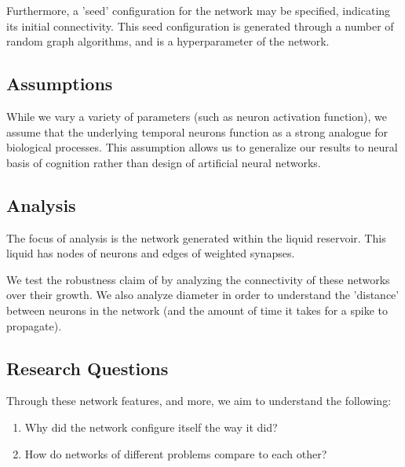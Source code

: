 Furthermore, a 'seed' configuration for the network may be specified, indicating
its initial connectivity. This seed configuration is generated through a
number of random graph algorithms, and is a hyperparameter of the network.

\subsection{Assumptions}

While we vary a variety of parameters (such as neuron activation function), we
assume that the underlying temporal neurons function as a strong analogue for
biological processes. This assumption allows us to generalize our results to
neural basis of cognition rather than design of artificial neural networks.

\subsection{Analysis}

The focus of analysis is the network generated within the liquid reservoir. This
liquid has nodes of neurons and edges of weighted synapses.

We test the robustness claim of \cite{LSM Constraints} by analyzing the
connectivity of these networks over their growth. We also analyze diameter in
order to understand the 'distance' between neurons in the network (and the
amount of time it takes for a spike to propagate).

\subsection{Research Questions}

Through these network features, and more, we aim to understand the following:

\begin{enumerate}
    \item Why did the network configure itself the way it did?
    \item How do networks of different problems compare to each other?
\end{enumerate}